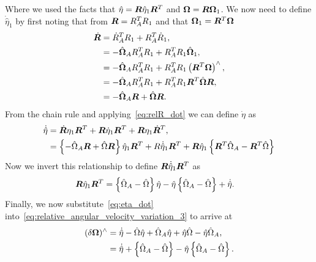 Where we used the facts that \( \hat{\eta} = \bm{R} \hat{\eta}_1 \bm{R}^T \) and \( \bm{\Omega} = \bm{R} \bm{\Omega}_1\). 
We now need to define \( \dot{\hat{\eta}}_1\) by first noting that from \( \bm{R} = R_A^T R_1\) and that \( \bm{\Omega}_1 = \bm{R}^T \bm{\Omega}\)
\begin{align}\label{eq:relR_dot}
    \dot{\bm{R}} &= \dot{R}_A^T R_1 + R_A^T \dot{R}_1 , \nonumber\\
                 &= - \hat{\bm{\Omega}}_A R_A^T R_1 + R_A^T R_1 \hat{\bm{\Omega}}_1 ,\nonumber\\
                 &= -\hat{\bm{\Omega}}_A R_A^T R_1 + R_A^T R_1 \left( \bm{R}^T \bm{\Omega} \right)^\wedge , \nonumber\\
                 &= -\hat{\bm{\Omega}}_A R_A^T R_1 + R_A^T R_1 \bm{R}^T \hat{\bm{\Omega}} \bm{R} ,\nonumber\\
                 &= -\hat{\bm{\Omega}}_A\bm{R} + \hat{\bm{\Omega}} \bm{R} .
\end{align}
From the chain rule and applying~\cref{eq:relR_dot} we can define \( \dot{\eta} \) as
\begin{align}\label{eq:eta_dot_1}
    \dot{\hat{\eta}} &= \dot{\bm{R}} \eta_1 \bm{R}^T + \bm{R} \dot{\eta}_1 \bm{R}^T + \bm{R} \eta_1 \dot{\bm{R}}^T , \nonumber\\
                     &= \left\{ - \hat{\Omega}_A \bm{R} + \hat{\Omega} \bm{R} \right\} \hat{\eta}_1 \bm{R}^T + R \dot{\hat{\eta}}_1 \bm{R}^T + \bm{R} \hat{\eta}_1 \left\{ \bm{R}^T \hat{\Omega}_A - \bm{R}^T \hat{\Omega} \right\}
\end{align}
Now we invert this relationship to define \( \bm{R} \dot{\hat{\eta}}_1 \bm{R}^T \) as
\begin{align}\label{eq:eta_dot}
    \bm{R} \hat{\eta}_1 \bm{R}^T &= \left\{ \hat{\Omega}_A - \hat{\Omega} \right\} \hat{\eta} - \hat{\eta} \left\{ \hat{\Omega}_A - \hat{\Omega} \right\} + \dot{\hat{\eta}} .
\end{align}
Finally, we now substitute~\cref{eq:eta_dot} into~\cref{eq:relative_angular_velocity_variation_3} to arrive at
\begin{align}\label{eq:rel_ang_vel_var}
    (\delta \bm{\Omega})^\wedge &= \dot{\hat{\eta}} - \hat{\Omega} \hat{\eta} + \hat{\Omega}_A \hat{\eta} + \hat{\eta} \hat{\Omega} - \hat{\eta} \hat{\Omega}_A , \\
                                   &= \dot{\hat{\eta}} + \left\{ \hat{\Omega}_A - \hat{\Omega} \right\} - \hat{\eta} \left\{ \hat{\Omega}_A - \hat{\Omega} \right\} . 
\end{align}

